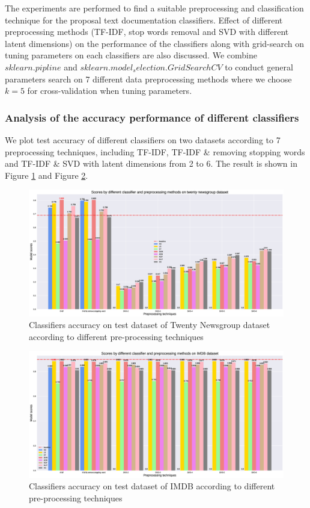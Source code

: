 \documentclass[11pt]{scrartcl}
\begin{document}
The experiments are performed to find a suitable preprocessing and classification technique for the proposal text documentation classifiers. Effect of different preprocessing methods (TF-IDF, stop words removal and SVD with different latent dimensions) on the performance of the classifiers along with grid-search on tuning parameters on each classifiers are also discussed. We combine $sklearn.pipline$ and $sklearn.model_selection.GridSearchCV$ to conduct general parameters search on 7 different data preprocessing methods where we choose $k=5$ for cross-validation when tuning parameters. 

\subsubsection*{Analysis of the accuracy performance of different classifiers}
We plot test accuracy of different classifiers on two datasets according to 7 preprocessing techniques, including TF-IDF, TF-IDF \& removing stopping words and TF-IDF \& SVD with latent dimensions from 2 to 6. The result is shown in Figure \ref{accuracy_20} and Figure \ref{accuracy_imdb}.

\begin{figure}[H]
	\centering
	\includegraphics[width=0.9\linewidth]{fig/model_acc_20.eps}
	\caption{Classifiers accuracy on test dataset of Twenty Newsgroup dataset according to different pre-processing techniques}
	\label{accuracy_20}
\end{figure}

\begin{figure}[H]
	\centering
	\includegraphics[width=0.9\linewidth]{fig/model_acc_imdb.eps}
	\caption{Classifiers accuracy on test dataset of IMDB according to different pre-processing techniques}
	\label{accuracy_imdb}
\end{figure}
\end{document}
